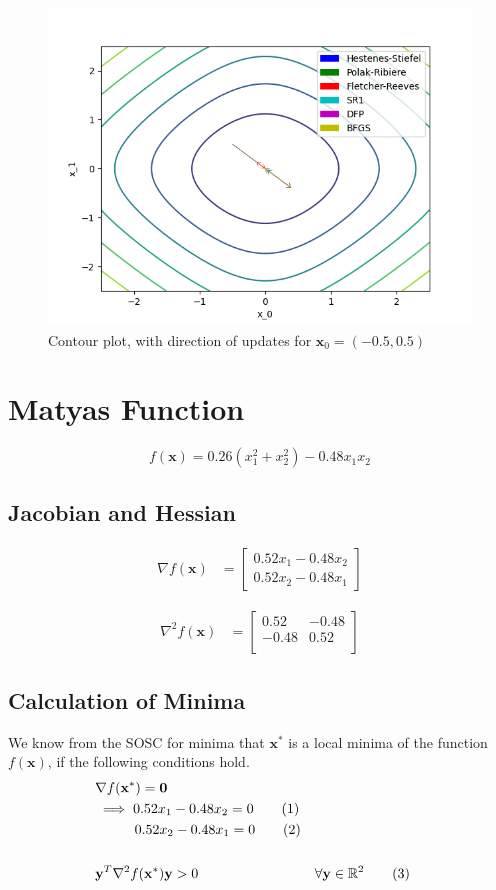 \documentclass[a4paper]{article}
\newcommand\numberthis{\addtocounter{equation}{1}\tag{\theequation}}
\begin{document}
\begin{figure}[H]
    \centering
    \includegraphics[width=.65\textwidth]{func_1_cont.png}
    \caption{Contour plot, with direction of updates for $\textbf{x}_0 = (-0.5, 0.5)$}
\end{figure}

\section{Matyas Function}

$$f(\textbf{x}) = 0.26(x_1^2 + x_2^2) - 0.48 x_1 x_2$$

\subsection{Jacobian and Hessian}

\begin{align*}
\nabla f(\textbf{x}) &=
    \begin{bmatrix}
        0.52x_1 - 0.48x_2 \\
        0.52x_2 - 0.48x_1
    \end{bmatrix}
\end{align*}

\begin{align*}
\nabla^2 f(\textbf{x}) &=
    \begin{bmatrix}
        0.52 & -0.48 \\
        -0.48 & 0.52 \\
    \end{bmatrix}
\end{align*}

\subsection{Calculation of Minima}

We know from the SOSC for minima that $\textbf{x}^*$ is a local minima of the function $f(\textbf{x})$, if the following conditions hold.
\begin{align*}
&\nabla f(\textbf{x}^*) = \textbf{0} \\
&\implies 0.52x_1 - 0.48x_2 = 0 \numberthis \label{matyas-sosc-1} \\
&\phantom{\implies} \ \ 0.52x_2 - 0.48x_1 = 0 \numberthis \label{matyas-sosc-2} \\ \\
&\textbf{y}^T \nabla^2 f(\textbf{x}^*) \textbf{y} > 0 &&\forall \textbf{y} \in \mathbb{R}^2 \numberthis \label{matyas-sosc-3}
\end{align*}
\end{document}
